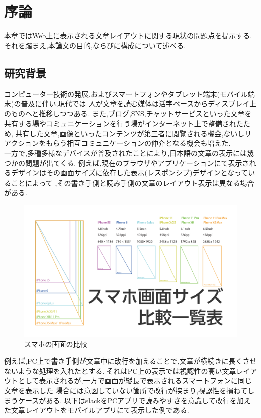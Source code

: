 
\chapter{序論}
\label{chap:introduction}

本章ではWeb上に表示される文章レイアウトに関する現状の問題点を提示する.
それを踏まえ,本論⽂の目的,ならびに構成について述べる.

\newpage

\section{研究背景}

コンピューター技術の発展,およびスマートフォンやタブレット端末(モバイル端末)の普及に伴い,現代では
人が文章を読む媒体は活字ベースからディスプレイ上のものへと推移しつつある.
また,ブログ,SNS,チャットサービスといった文章を共有する場やコミュニケーションを行う場がインターネット上で整備されたため,
共有した文章,画像といったコンテンツが第三者に閲覧される機会,ないしリアクションをもらう相互コミュニケーションの仲介となる機会も増えた.
\\一方で,多種多様なデバイスが普及されたことにより,日本語の文章の表示には幾つかの問題が出てくる.
例えば,現在のブラウザやアプリケーションにて表示されるデザインはその画面サイズに依存した表示(レスポンシブ)デザインとなっていることによって
,その書き手側と読み手側の文章のレイアウト表示は異なる場合がある.

\begin{figure}[H]
    \centering
    \label{fig:image1}
    \includegraphics[width=0.7\columnwidth]{image/01/img1.png}
    \caption[スマホの画面の比較] {スマホの画面の比較\footnotemark[1]}
\end{figure}


例えば,PC上で書き手側が文章中に改行を加えることで,文章が横続きに長くさせないような処理を入れたとする.
それはPC上の表示では視認性の高い文章レイアウトとして表示されるが,一方で画面が縦長で表示されるスマートフォンに同じ文章を表示した
場合には意図していない箇所で改行が挟まり,視認性を損ねてしまうケースがある.
以下はslack\footnotemark[2]をPCアプリで読みやすさを意識して改行を加えた文章レイアウトをモバイルアプリにて表示した例である.


